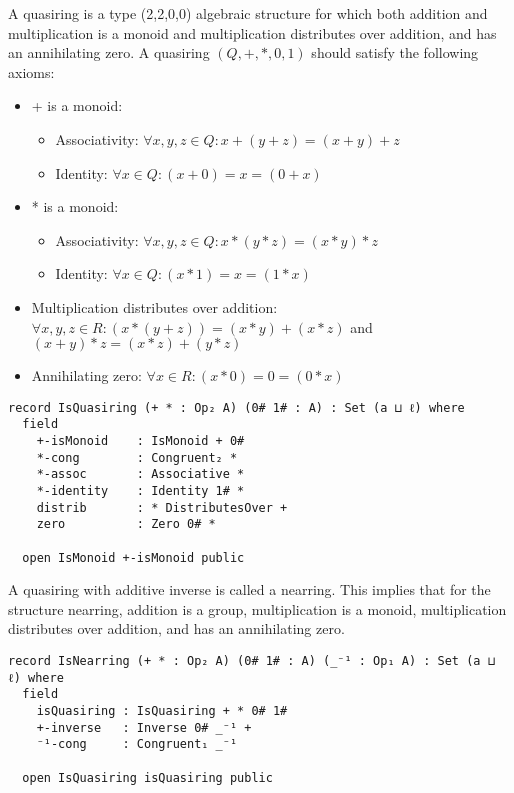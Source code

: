 A quasiring is a type (2,2,0,0) algebraic structure for which both addition and
multiplication is a monoid and multiplication distributes over addition, and has
an annihilating zero. A quasiring $(Q,+,*,0,1)$ should satisfy the following axioms:
\begin{itemize}
  \item + is a monoid:
  \begin{itemize}
    \item Associativity: $\forall x,y,z \in Q: x + (y + z) = (x + y) + z$
    \item Identity: $\forall x \in Q: (x + 0) = x = (0 + x)$
  \end{itemize}
  \item * is a monoid:
  \begin{itemize}
    \item Associativity: $ \forall x,y,z \in Q: x * (y*z)  = (x*y)*z$
    \item Identity: $\forall x \in Q: (x * 1) = x = (1 * x)$
  \end{itemize}
  \item Multiplication distributes over addition: \(\forall x , y , z \in R: (x * (y + z)) = (x * y) + (x
  * z)\) and \( (x + y) * z = (x * z) + (y * z) \)
  \item Annihilating zero: \(\forall x \in R: (x * 0) = 0 = (0 * x)\)
\end{itemize}

\begin{verbatim}
record IsQuasiring (+ * : Op₂ A) (0# 1# : A) : Set (a ⊔ ℓ) where
  field
    +-isMonoid    : IsMonoid + 0#
    *-cong        : Congruent₂ *
    *-assoc       : Associative *
    *-identity    : Identity 1# *
    distrib       : * DistributesOver +
    zero          : Zero 0# *

  open IsMonoid +-isMonoid public
\end{verbatim}

A quasiring with additive inverse is called a nearring. This implies that for
the structure nearring, addition is a group, multiplication is a monoid,
multiplication distributes over addition, and has an annihilating zero.

\begin{verbatim}
record IsNearring (+ * : Op₂ A) (0# 1# : A) (_⁻¹ : Op₁ A) : Set (a ⊔ ℓ) where
  field
    isQuasiring : IsQuasiring + * 0# 1#
    +-inverse   : Inverse 0# _⁻¹ +
    ⁻¹-cong     : Congruent₁ _⁻¹

  open IsQuasiring isQuasiring public
\end{verbatim}

